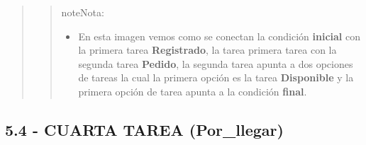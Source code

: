 \documentclass[letterpaper,11pt,spanish]{sphinxmanual}
\begin{document}
\begin{quote}
\begin{quote}
\begin{notice}{note}{Nota:}
\begin{itemize}
\item {} 
En esta imagen vemos como se conectan la condición  \textbf{inicial} con la primera tarea \textbf{Registrado}, la tarea primera tarea con la segunda tarea \textbf{Pedido}, la segunda tarea apunta a dos opciones de tareas la cual la primera opción es la tarea \textbf{Disponible} y la primera opción de tarea apunta a la condición \textbf{final}.

\end{itemize}
\end{notice}
\end{quote}
\end{quote}


\subsection{\textbf{5.4 - CUARTA TAREA (Por\_llegar)}}
\end{document}
